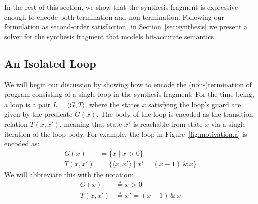 \documentclass[preprint]{sigplanconf}
\theoremstyle{definition}
\begin{document}
In the rest of this section, we show that the synthesis fragment 
is expressive enough to encode both termination and non-termination. %
Following our formulation as second-order satisfaction, %
in Section~\ref{sec:synthesis} we present a solver for the synthesis fragment that models bit-accurate semantics. 


\subsection{An Isolated Loop}

We will begin our discussion by showing how to encode the (non-)termination
of program consisting of a single loop in the synthesis fragment.  For the
time being, a loop is a pair ${L= \langle G,T \rangle}$, where the states
$x$ satisfying the loop's guard are given by the predicate $G(x)$.  The body
of the loop is encoded as the transition relation $T(x, x')$, meaning that
state $x'$ is reachable from state $x$ via a single iteration of the loop
body.  For example, the loop in Figure~\ref{fig:motivation.a} is encoded as:
%
\begin{align*}
G(x) & = \{ x \mid x>0 \} \\
T(x,x') &= \{ \langle x, x' \rangle \mid x' = (x - 1) \, \& \, x \}
\end{align*}
We will abbreviate this with the notation:
\begin{align*}
G(x) & \triangleq x > 0 \\
T(x, x') & \triangleq x' = (x - 1) \, \& \, x
\end{align*}
\end{document}
